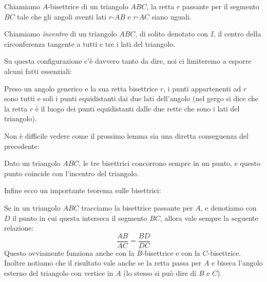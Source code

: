 \documentclass[11pt]{scrartcl}
\begin{document}
	\begin{definition}
		Chiamiamo $A$-bisettrice di un triangolo $ABC$, la retta $r$ passante per il segmento $BC$ tale che gli angoli aventi lati $r$-$AB$ e $r$-$AC$ siano uguali.
	\end{definition}
	\begin{definition}
		Chiamiamo \emph{incentro} di un triangolo $ABC$, di solito denotato con $I$, il centro della circonferenza tangente a tutti e tre i lati del triangolo. 
	\end{definition}
	Su questa configurazione c'è davvero tanto da dire, noi ci limiteremo a esporre alcuni fatti essenziali:
	\begin{lemma}
		Preso un angolo generico e la sua retta bisettrice $r$, i punti appartenenti ad $r$ sono tutti e soli i punti equidistanti dai due lati dell'angolo (nel gergo si dice che la retta $r$ è il luogo dei punti equidistanti dalle due rette che sono i lati del triangolo).
	\end{lemma}
	Non è difficile vedere come il prossimo lemma sia una diretta conseguenza del \mbox{precedente}:
	\begin{corollary}
		Dato un triangolo $ABC$, le tre bisettrici concorrono sempre in un punto, e questo punto coincide con l'incentro del triangolo.
	\end{corollary}
	Infine ecco un importante teorema sulle bisettrici:
	\begin{theorem}
		Se in un triangolo $ABC$ tracciamo la bisettrice passante per $A$, e denotiamo con $D$ il punto in cui questa interseca il segmento $BC$, allora vale sempre la seguente relazione:
		$$\frac{AB}{AC}=\frac{BD}{DC}$$
		Questo ovviamente funziona anche con la $B$-bisettrice e con la $C$-bisettrice. Inoltre notiamo che il risultato vale anche se la retta passa per $A$ e biseca l'angolo esterno del triangolo con vertice in $A$ (lo stesso si può dire di $B$ e $C$).
	\end{theorem}
\end{document}
